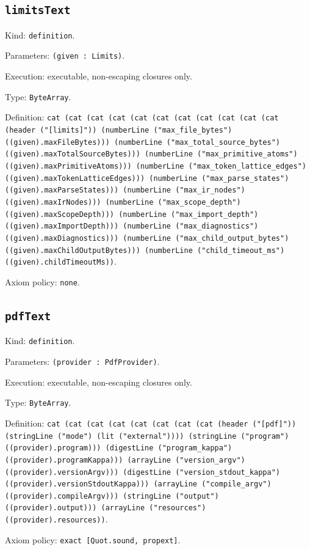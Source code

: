 \documentclass[11pt]{article}
\begin{document}
\subsection*{\texttt{limitsText}}
\noindent Kind: \texttt{definition}.\par
\noindent Parameters: \texttt{(given : Limits)}.\par
\noindent Execution: executable, non-escaping closures only.\par
\noindent Type: \texttt{ByteArray}.\par
\noindent Definition: \texttt{cat (cat (cat (cat (cat (cat (cat (cat (cat (cat (cat (header ("[limits]")) (numberLine ("max\_file\_bytes") ((given).maxFileBytes))) (numberLine ("max\_total\_source\_bytes") ((given).maxTotalSourceBytes))) (numberLine ("max\_primitive\_atoms") ((given).maxPrimitiveAtoms))) (numberLine ("max\_token\_lattice\_edges") ((given).maxTokenLatticeEdges))) (numberLine ("max\_parse\_states") ((given).maxParseStates))) (numberLine ("max\_ir\_nodes") ((given).maxIrNodes))) (numberLine ("max\_scope\_depth") ((given).maxScopeDepth))) (numberLine ("max\_import\_depth") ((given).maxImportDepth))) (numberLine ("max\_diagnostics") ((given).maxDiagnostics))) (numberLine ("max\_child\_output\_bytes") ((given).maxChildOutputBytes))) (numberLine ("child\_timeout\_ms") ((given).childTimeoutMs))}.\par
\noindent Axiom policy: \texttt{none}.\par
\subsection*{\texttt{pdfText}}
\noindent Kind: \texttt{definition}.\par
\noindent Parameters: \texttt{(provider : PdfProvider)}.\par
\noindent Execution: executable, non-escaping closures only.\par
\noindent Type: \texttt{ByteArray}.\par
\noindent Definition: \texttt{cat (cat (cat (cat (cat (cat (cat (cat (header ("[pdf]")) (stringLine ("mode") (lit ("external")))) (stringLine ("program") ((provider).program))) (digestLine ("program\_kappa") ((provider).programKappa))) (arrayLine ("version\_argv") ((provider).versionArgv))) (digestLine ("version\_stdout\_kappa") ((provider).versionStdoutKappa))) (arrayLine ("compile\_argv") ((provider).compileArgv))) (stringLine ("output") ((provider).output))) (arrayLine ("resources") ((provider).resources))}.\par
\noindent Axiom policy: \texttt{exact [Quot.sound, propext]}.\par
\end{document}
